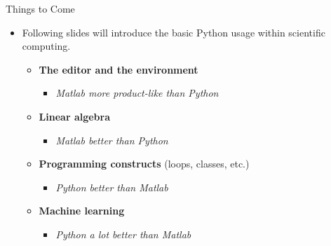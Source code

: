 \documentclass[10pt, aspectratio=169]{beamer} %
\begin{document}
\begin{frame}[fragile]{Things to Come}
\begin{itemize}
\item Following slides will introduce the basic Python usage within scientific computing.
\begin{itemize}
\item \textbf{The editor and the environment} 
\begin{itemize}
\item \emph{Matlab more product-like than Python}
\end{itemize}
\item \textbf{Linear algebra} 
\begin{itemize}
\item \emph{Matlab better than Python}
\end{itemize}
\item \textbf{Programming constructs} (loops, classes, etc.) 
\begin{itemize}
\item  \emph{Python better than Matlab}
\end{itemize}
\item \textbf{Machine learning} 
\begin{itemize}
\item  \emph{Python a lot better than Matlab}
\end{itemize}
\end{itemize}
\end{itemize}
\end{frame}
\end{document}
